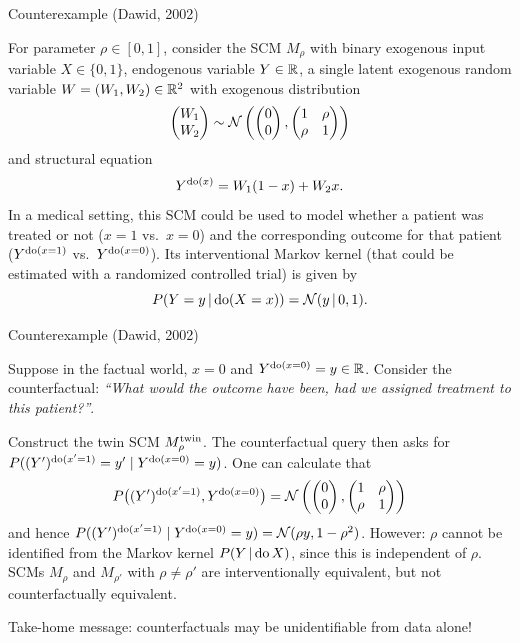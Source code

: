 \begin{frame}{Counterexample (Dawid, 2002)}
\begin{example}[1/2]
  For parameter $\rho\in[0,1]$, consider the SCM $M_\rho$ with binary exogenous input variable $X \in \{0,1\}$, endogenous variable $Y \in \mathbb{R}$, a single latent exogenous random variable $W = (W_1,W_2) \in \mathbb{R}^2$ with
exogenous distribution 
  $$\begin{pmatrix} W_1 \\ W_2 \end{pmatrix}\sim\mathcal{N}\left(\begin{pmatrix}0 \\ 0\end{pmatrix},\begin{pmatrix}1&\rho\\ \rho&1\end{pmatrix}\right)$$
and structural equation
  $$Y^{\operatorname{do}(x)} = W_1 (1 - x) + W_2 x.$$
  In a medical setting, this SCM could be used to model whether a patient was treated or not ($x=1$ vs.\ $x=0$) and the corresponding outcome for that patient ($Y^{\operatorname{do}(x=1)}$ vs.\ $Y^{\operatorname{do}(x=0)}$).
  Its interventional Markov kernel (that could be estimated with a randomized controlled trial) is given by
  $$P(Y = y \operatorname*{|} \operatorname{do}(X=x)) = \mathcal{N}(y \operatorname*{|} 0,1).$$
\end{example}
\end{frame}

\begin{frame}{Counterexample (Dawid, 2002)}
\begin{example}[2/2]
  Suppose in the factual world, $x = 0$ and $Y^{\operatorname{do}(x=0)} = y \in \mathbb{R}$.
  Consider the counterfactual: {\it ``What would the outcome have been, had we assigned treatment to this patient?''}.

  Construct the twin SCM $M_{\rho}^{\mathrm{twin}}$.
  The counterfactual query then asks for $P((Y')^{\operatorname{do}(x'=1)}=y'\mid Y^{\operatorname{do}(x=0)}=y)$. One can calculate that
$$
  P\big((Y')^{\operatorname{do}(x'=1)},Y^{\operatorname{do}(x=0)}\big) = \mathcal{N}\left(\begin{pmatrix}0\\ 0\end{pmatrix}, \begin{pmatrix} 1 & \rho \\ \rho & 1 \end{pmatrix}\right)
$$
  and hence $P((Y')^{\operatorname{do}(x'=1)} \mid Y^{\operatorname{do}(x=0)}=y) = \mathcal{N}(\rho y,1-\rho^2)$. 
  However: $\rho$ \alert{cannot be identified} from the Markov kernel $P(Y\operatorname*{|} \operatorname{do} X)$, since this is independent of $\rho$. 
  SCMs $M_{\rho}$ and $M_{\rho'}$ with $\rho\neq\rho'$ are interventionally equivalent, but not counterfactually equivalent.
\end{example}
Take-home message: counterfactuals may be unidentifiable from data alone!
\end{frame}

